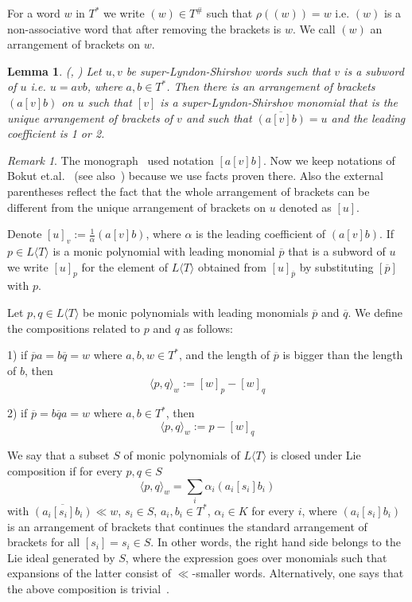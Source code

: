 \documentclass[12pt, reqno]{amsart}
\newtheorem{lemma}[theorem]{Lemma}
\theoremstyle{remark}
\newtheorem{remark}[theorem]{Remark}
\theoremstyle{definition}
\numberwithin{equation}{section}
\begin{document}
 For a word $w$ in $T^*$ we write $(w) \in T^{\#}$ such that $\rho ( (w)) = w$ i.e. $(w)$ is a non-associative word that after removing the brackets is $w$.  
 We call  $(w)$ an arrangement of brackets on $w$.


 \begin{lemma} (\cite[Lemma 2.3]{B-K-L-M}, \cite[Lemma 3.3.2]{BMPZ})
 Let $u, v$ be super-Lyndon-Shirshov words such that $v$ is a subword of $u$ i.e. $u = a v b$, where $a,b \in T^*$. 
 Then there is an arrangement of brackets 
  $(a[v]b)$ on $u$  such that  $[v]$  is a super-Lyndon-Shirshov monomial  that is 
  the unique arrangement of brackets of $v$   and such that $\overline{(a[v]b)} = u$ and the leading coefficient is 1 or 2.
 \end{lemma}

\begin{remark} The monograph~\cite{BMPZ} used notation $[a[v]b]$.
Now we keep notations of Bokut et.al.~\cite{B-K-L-M} (see also~\cite{L-P-Z}) because we use facts proven there.
Also the external parentheses  reflect the fact that the whole arrangement of brackets can be different from the unique arrangement of brackets on $u$ denoted as $[u]$.    
\end{remark}


Denote $[u]_v := \frac{1}{\alpha}  (a [v] b)  $, 
where $\alpha$ is the leading coefficient of   $(a [v] b)$. If $p \in L \langle T \rangle $ is  a monic polynomial with leading monomial 
$\overline{p}$ that is a subword of $u$ we write $[u]_p$ for the element of $L \langle T \rangle$ obtained from $[u]_{\overline {p}}$ by  substituting 
{ $[\overline{p}]$} with $p$.

Let $p,q \in L \langle T \rangle$ be monic polynomials with leading monomials $\overline{p}$ and $\overline{q}$. We define the compositions related to $p$ and $q$  as follows:

1) if $\overline{p} a = b \overline{q} = w$ where $a,b,w \in T^*$, and the length of $\overline{p}$ is bigger than the length of $b$, then
$$\langle p, q \rangle_w := [w]_p - [w]_q$$

2) if  $\overline{p} = b \overline{q} a= w$  where $a,b \in T^*$, then
$$\langle p, q \rangle_w := p - [w]_q$$

 We say that a subset $S$ of monic polynomials of  $L \langle T \rangle$ is closed under Lie composition if for every $p,q \in S$  
 $$\langle p, q \rangle_w = \sum_i \alpha_i  (a_i [s_i] b_i)$$
with $ \overline{(a_i [ s_i] b_i)} \ll  w$, $s_i \in S$,  { $a_i,b_i\in T^*$}, $\alpha_i \in K$ for every $i$, 
where  $(a_i [s_i] b_i )$ is an arrangement of brackets 
that continues the standard arrangement of brackets  for all $[s_i]=s_i\in S$.
In other words, the right hand side belongs to the Lie ideal generated  by $S$, where the expression goes over monomials
such that expansions of the latter consist of  $\ll$-smaller words.
Alternatively, one says that the above composition is trivial~\cite{L-P-Z}.
\end{document}
